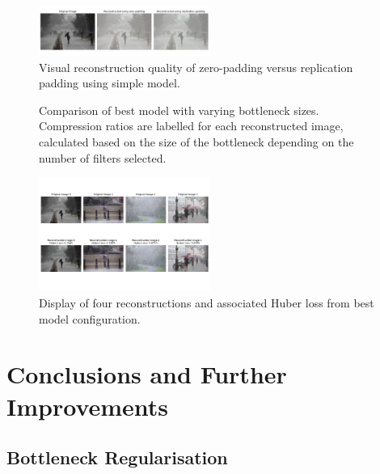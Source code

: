\documentclass[10pt,twocolumn,letterpaper]{article}
\begin{document}
\begin{figure}[ht]
    \centering
    \includegraphics[width=0.5\textwidth]{PaddingReconstructions.png} 
    \caption{Visual reconstruction quality of zero-padding versus replication padding using simple model.}
    \label{fig:reconstruction-quality-padding}
\end{figure}

\begin{figure}[ht]
    \centering
    \caption{Comparison of best model with varying bottleneck sizes. Compression ratios are labelled for each reconstructed image, calculated based on the size of the bottleneck depending on the number of filters selected.}
    \label{fig:reconstruction-loss-comparison}
\end{figure}


\begin{figure}[ht]
    \centering
    \includegraphics[width=0.5\textwidth]{ReconstructionQualityComparisons3.png} 
    \caption{Display of four reconstructions and associated Huber loss from best model configuration.}
    \label{fig:reconstructions}
\end{figure}


\section{Conclusions and Further Improvements}


\subsection{Bottleneck Regularisation}
\end{document}
